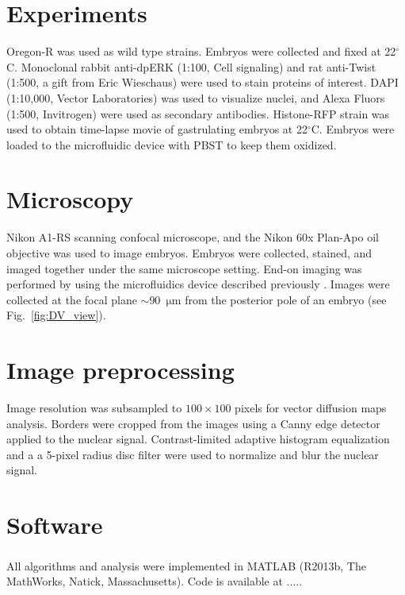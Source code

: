 \documentclass{pnastwo}
\newcommand{\fig}[0]{Fig.}
\begin{document}
\begin{article}




\begin{materials}

\section{Experiments}
%
Oregon-R was used as wild type strains. 
%
Embryos were collected and fixed at 22$^\circ$C. 
%
Monoclonal rabbit anti-dpERK (1:100, Cell signaling) and rat anti-Twist (1:500, a gift from Eric Wieschaus) were used to stain proteins of interest. 
%
DAPI (1:10,000, Vector Laboratories) was used to visualize nuclei, and Alexa Fluors (1:500, Invitrogen) were used as secondary antibodies. 
%
Histone-RFP strain was used to obtain time-lapse movie of gastrulating embryos at 22$^\circ$C. 
%
Embryos were loaded to the microfluidic device with PBST to keep them oxidized. 

\section{Microscopy}
%
Nikon A1-RS scanning confocal microscope, and the Nikon 60x Plan-Apo oil objective was used to image embryos. 
%
Embryos were collected, stained, and imaged together under the same microscope setting. 
%
End-on imaging was performed by using the microfluidics device described previously \cite{chung2010microfluidic}.
%
Images were collected at the focal plane $\sim$90~$\mathrm{\mu m}$ from the posterior pole of an embryo (see \fig~\ref{fig:DV_view}).  

\section{Image preprocessing}
%
Image resolution was subsampled to $100 \times 100$ pixels for vector diffusion maps analysis.
%
Borders were cropped from the images using a Canny edge detector applied to the nuclear signal. 
%
Contrast-limited adaptive histogram equalization and a a 5-pixel radius disc filter were used to normalize and blur the nuclear signal.

\section{Software}
%
All algorithms and analysis were implemented in MATLAB\textsuperscript{\textregistered} (R2013b, The MathWorks, Natick, Massachusetts).
%
Code is available at .....


\end{materials}
\end{article}
\end{document}

